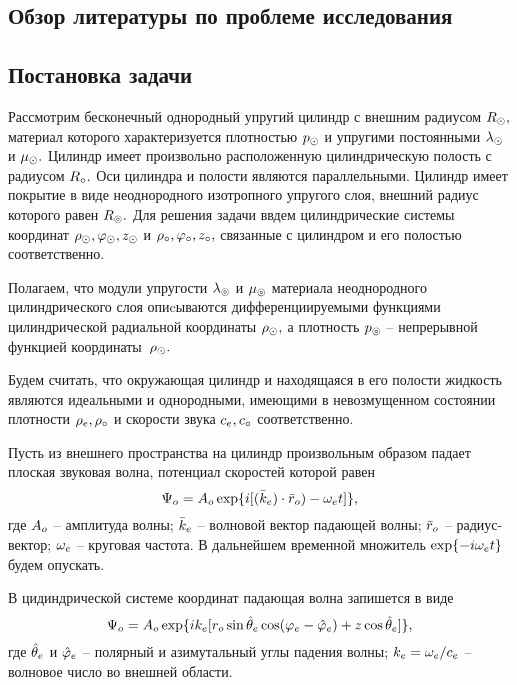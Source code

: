 \newpage
\subsection{Обзор литературы по проблеме исследования}

\newpage
\subsection{Постановка задачи} 

Рассмотрим бесконечный однородный упругий цилиндр с внешним радиусом $R_\odot,$ материал которого характеризуется плотностью $p_\odot$ и упругими постоянными $\lambda_\odot$ и $\mu_\odot.$ Цилиндр имеет произвольно расположенную цилиндрическую полость с радиусом $R_\circ.$ Оси цилиндра и полости являются параллельными. Цилиндр имеет покрытие в виде неоднородного изотропного упругого слоя, внешний радиус которого равен $R_\circledcirc.$ Для решения задачи ввдем цилиндрические системы координат $\rho_\odot, \varphi_\odot, z_\odot$ и $\rho_\circ, \varphi_\circ, z_\circ,$ связанные с цилиндром и его полостью соответственно.

Полагаем, что модули упругости $\lambda_\circledcirc$ и $\mu_\circledcirc$ материала неоднородного цилиндрического слоя опиcываются дифференциируемыми функциями цилиндрической радиальной координаты $\rho_\odot,$ а плотность $p_\circledcirc$ -- непрерывной функцией координаты~$\rho_\odot.$ 

Будем считать, что окружающая цилиндр и находящаяся в его полости жидкость являются идеальными и однородными, имеющими в невозмущенном состоянии плотности $\rho_e, \rho_\circ$ и скорости звука $c_e, c_\circ$ соответственно.

Пусть из внешнего пространства на цилиндр произвольным образом падает плоская звуковая волна, потенциал скоростей которой равен
$$\Psi_o=A_o \exp\{i[(\bar{k}_e)\cdot \bar{r}_o)-\omega_e t]\},$$
где $A_o$ -- амплитуда волны; $\bar{k}_e$ -- волновой вектор падающей волны; $\bar{r}_o$ -- радиус-вектор; $\omega_e$ -- круговая частота. В дальнейшем временной множитель $\exp\{-i\omega_e t\}$ будем опускать.

В цидиндрической системе координат падающая волна запишется в виде
$$\Psi_o=A_o\exp\{ik_e[r_o\sin{\hat{\theta}_e}\cos(\varphi_e-\hat{\varphi}_e)+z\cos\hat{\theta}_e]\},$$
где $\hat{\theta}_e$ и $\hat{\varphi}_e$ -- полярный и азимутальный углы падения волны; $k_e=\omega_e / c_e$ -- волновое число во внешней области.

